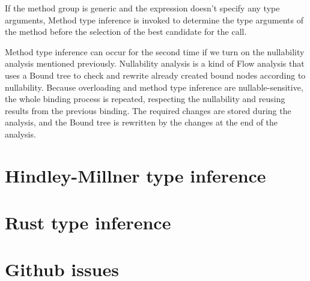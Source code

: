If the method group is generic and the expression doesn’t specify any type arguments, Method type inference is invoked to determine the type arguments of the method before the selection of the best candidate for the call.
\par
{}
Method type inference can occur for the second time if we turn on the nullability analysis mentioned previously. 
Nullability analysis is a kind of Flow analysis that uses a Bound tree to check and rewrite already created bound nodes according to nullability. 
Because overloading and method type inference are nullable-sensitive, the whole binding process is repeated, respecting the nullability and reusing results from the previous binding. 
The required changes are stored during the analysis, and the Bound tree is rewritten by the changes at the end of the analysis.

\section{Hindley-Millner type inference}


\section{Rust type inference}


\section{Github issues}


